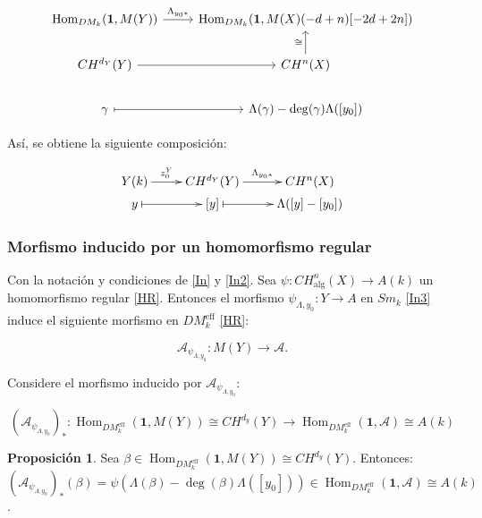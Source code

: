 \documentclass[10pt]{amsart}
\theoremstyle{definition}
\newtheorem{proposition}[definition]{Proposici\'on}
\theoremstyle{remark}
\theoremstyle{definition}
\begin{document}
\begingroup{}
\[
\begin{tikzcd}\label{MF}
\operatorname{Hom}_{DM_{k}}(\mathbf{1}, M(Y)) \arrow[r, "\Lambda_{y_{0}*}"] & \operatorname{Hom}_{DM_{k}}(\mathbf{1}, M(X)(-d + n)[-2d + 2n]) \\
CH^{d_{Y}}(Y) \arrow[r] & CH^{n}(X) \arrow[u, "\cong"] \\
\gamma \arrow[r, mapsto] & \Lambda(\gamma) - \deg(\gamma)\Lambda([y_{0}])
\end{tikzcd}
\] \label{Reldig}


Así, se obtiene la siguiente composición:

\begin{align}  \label{diag.algequiv}
\begin{split}
\xymatrix@R=0.1pc{Y(k) \ar[r]^-{z_0 ^Y}& CH^{d_Y}(Y) \ar[r]^-{\Lambda _{y_0 \ast}}
& CH^n(X) \\
y \ar@{|->}[r]&[y] \ar@{|->}[r]& \Lambda ([y] -  [y_0 ])}
\end{split}
\end{align}

\subsubsection{Morfismo inducido por un homomorfismo regular}\label{3.2.2}Con la notación y condiciones de \ref{In} y \ref{In2}. Sea $\psi:CH^{n}_{\mathrm{alg}}(X)\to A(k)$ un homomorfismo regular \ref{HR}. Entonces el morfismo $\psi_{\Lambda,y_{0}}:Y\to A$ en $Sm_{k}$ \ref{In3} induce el siguiente morfismo en $DM^{\mathrm{eff}}_{k}$ \ref{HR}:

\[
\mathcal{A}_{\psi_{\Lambda,y_{0}}}:M(Y)\to\mathcal{A}.
\]

Considere el morfismo inducido por $\mathcal{A}_{\psi_{\Lambda,y_{0}}}$:

\[
(\mathcal{A}_{\psi_{\Lambda,y_{0}}})_{*}:\operatorname{Hom}_{DM^{\mathrm{eff }}_{k}}(\mathbf{1},M(Y))\cong CH^{d_{y}}(Y)\to\operatorname{Hom}_{DM^{\mathrm{ eff}}_{k}}(\mathbf{1},\mathcal{A})\cong A(k)
\]

\begin{proposition}\label{Prop323}
Sea $\beta\in\operatorname{Hom}_{DM^{\mathrm{eff}}_{k}}(\mathbf{1},M(Y))\cong CH^{d_{y}}(Y)$. Entonces:
\[
(\mathcal{A}_{\psi_{\Lambda,y_{0}}})_{*}(\beta)=\psi(\Lambda(\beta)- \deg(\beta)\Lambda([y_{0}]))\in\operatorname{Hom}_{DM^{\mathrm{eff}}_{k}}( \mathbf{1},\mathcal{A})\cong A(k)\].
\end{proposition}
\end{document}
